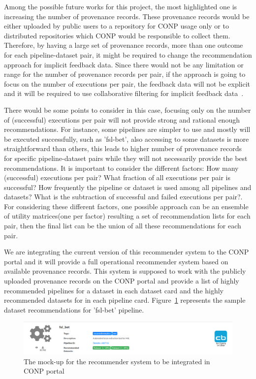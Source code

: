 Among the possible future works for this project, the most highlighted one is increasing the number of provenance records. These provenance records would be either uploaded by public users to a repository for CONP usage only or to distributed repositories which CONP would be responsible to collect them. Therefore, by having a large set of provenance records, more than one outcome for each pipeline-dataset pair, it might be required to change the recommendation approach for implicit feedback data. 
Since there would not be any limitation or range for the number of provenance records per pair, if the approach is going to focus on the number of executions per pair, the feedback data will not be explicit and it will be required to use collaborative filtering for implicit feedback data~\cite{hu2008collaborative}.

There would be some points to consider in this case, focusing only on the number of (successful) executions per pair will not provide strong and rational enough recommendations. For instance, some pipelines are simpler to use and mostly will be executed successfully, such as 'fsl-bet', also accessing to some datasets is more straightforward than others, this leads to higher number of provenance records for specific pipeline-dataset pairs while they will not necessarily provide the best recommendations. It is important to consider the different factors: How many (successful) executions per pair? What fraction of all executions per pair is successful? How frequently the pipeline or dataset is used among all pipelines and datasets? What is the subtraction of successful and failed executions per pair?. For considering these different factors, one possible approach can be an ensemble of utility matrices(one per factor) resulting a set of recommendation lists for each pair, then the final list can be the union of all these recommendations for each pair.

We are integrating the current version of this recommender system to the CONP portal and it will provide a full operational recommender system based on available provenance records. This system is supposed to work with the publicly uploaded provenance records on the CONP portal and provide a list of highly recommended pipelines for a dataset in each dataset card and the highly recommended datasets for in each pipeline card. Figure~\ref{fig:mockup} represents the sample dataset recommendations for 'fsl-bet' pipeline.

\begin{figure}
    \centering
    \includegraphics[width=\textwidth]{figures/mockup.png}
    \caption{The mock-up for the recommender system to be integrated in CONP portal}
    \label{fig:mockup}
\end{figure}